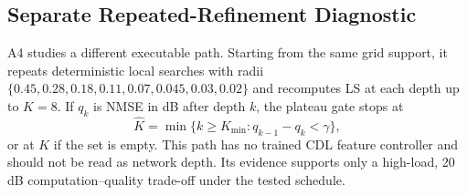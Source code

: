\subsection{Separate Repeated-Refinement Diagnostic}

A4 studies a different executable path. Starting from the same grid support, it repeats deterministic local searches with radii
$\{0.45,0.28,0.18,0.11,0.07,0.045,0.03,0.02\}$ and recomputes LS at each depth up to $K=8$. If $q_k$ is NMSE in dB after depth $k$, the plateau gate stops at
\begin{equation}
  \widehat K=\min\{k\geq K_{\min}: q_{k-1}-q_k<\gamma\},
  \label{eq:plateau_gate}
\end{equation}
or at $K$ if the set is empty. This path has no trained CDL feature controller and should not be read as network depth. Its evidence supports only a high-load, 20 dB computation--quality trade-off under the tested schedule.
